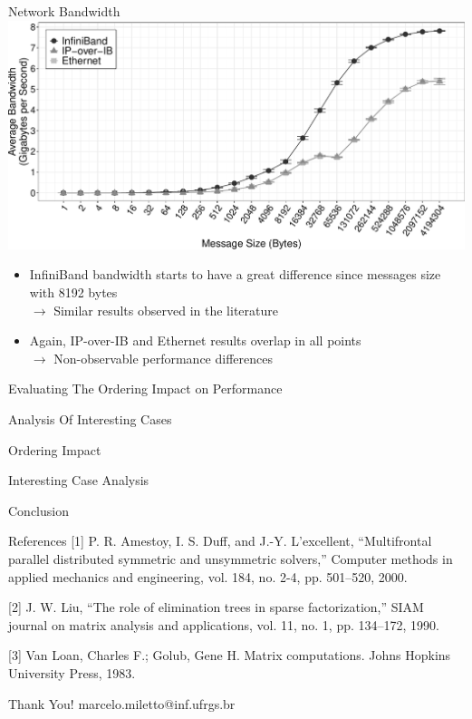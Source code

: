 \documentclass[presentation]{beamer}
\begin{document}
\begin{frame}{Network Bandwidth}
\includegraphics[width=\textwidth]{SLIDES/img/Bandwidth.pdf}
\begin{itemize}
    \item InfiniBand bandwidth starts to have a great difference since messages size with 8192 bytes\\
        $\to$ Similar results observed in the literature
    \item\pause Again, IP-over-IB and Ethernet results overlap in all points\\
        $\to$ Non-observable performance differences
\end{itemize}
\end{frame}



\begin{frame}[label={sec:orga503c53}]{Evaluating The Ordering Impact on Performance}
\end{frame}

\begin{frame}[label={sec:orge83a529}]{Analysis Of Interesting Cases}
\end{frame}

\begin{frame}[label={sec:org4d8e86e}]{Ordering Impact}
\end{frame}

\begin{frame}[label={sec:org003c168}]{Interesting Case Analysis}
\end{frame}
\begin{frame}[label={sec:org09ae9aa}]{Conclusion}
\end{frame}
\begin{frame}[label={sec:orgcc17679}]{References}
\footnotesize{[1] P. R. Amestoy, I. S. Duff, and J.-Y. L’excellent, “Multifrontal parallel
distributed symmetric and unsymmetric solvers,” Computer methods in applied mechanics and
engineering, vol. 184, no. 2-4, pp. 501–520, 2000.}

\footnotesize{[2] J. W. Liu, “The role of elimination trees in sparse factorization,”
SIAM journal on matrix analysis and applications, vol. 11, no. 1, pp. 134–172, 1990.}

\footnotesize{[3] Van Loan, Charles F.; Golub, Gene H. Matrix computations. Johns Hopkins
University Press, 1983.}
\end{frame}

\begin{frame}{}
\begin{center}
\Huge{Thank You!}
\vfill
\Large{marcelo.miletto@inf.ufrgs.br}
\end{center}
\end{frame}
\end{document}
